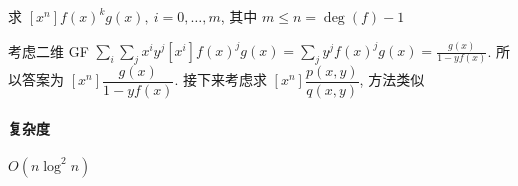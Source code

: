 求 \(\left[x^n\right]f(x)^kg(x),~i=0,\dots,m\), 其中 \(m\leq n=\deg(f)-1\)

考虑二维 GF \(\displaystyle\sum_{i}\sum_{j}x^iy^j\left[x^i\right]f(x)^jg(x)=\sum_{j}y^jf(x)^jg(x)=\frac{g(x)}{1-yf(x)}\). 所以答案为 \(\left[x^n\right]\dfrac{g(x)}{1-yf(x)}\). 接下来考虑求 \(\left[x^n\right]\dfrac{p(x,y)}{q(x,y)}\), 方法类似 

\paragraph{复杂度} \(O(n\log^2 n)\)
